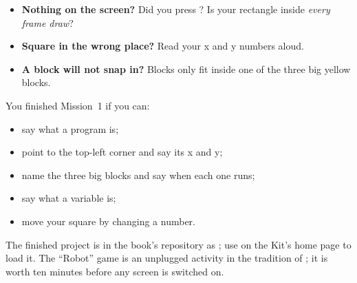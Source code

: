 \begin{itemize}
  \item \textbf{Nothing on the screen?} Did you press ? Is your
        rectangle inside \emph{every frame draw}?
  \item \textbf{Square in the wrong place?} Read your x and y numbers aloud.
  \item \textbf{A block will not snap in?} Blocks only fit inside one of the
        three big yellow blocks.
\end{itemize}

\begin{prgcheck}
You finished Mission~1 if you can:
\begin{itemize}
  \item say what a program is;
  \item point to the top-left corner and say its x and y;
  \item name the three big blocks and say when each one runs;
  \item say what a variable is;
  \item move your square by changing a number.
\end{itemize}
\end{prgcheck}

\begin{prggrownup}
The finished project is in the book's repository as
; use
 on the Kit's home page to load it. The ``Robot'' game is an
unplugged activity in the tradition of \citet{bell2009}; it is worth ten minutes
before any screen is switched on.
\end{prggrownup}

